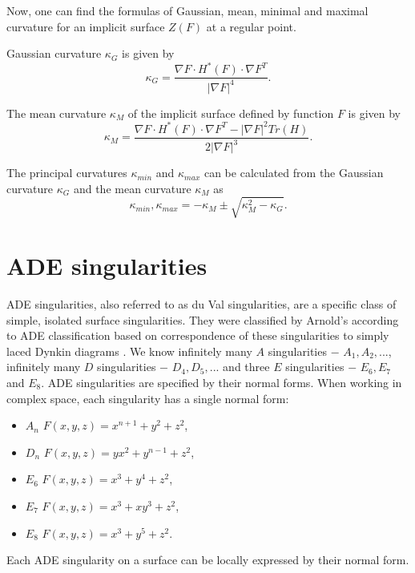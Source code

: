 Now, one can find the formulas of Gaussian, mean, minimal and maximal curvature
for an implicit surface $Z(F)$ at a regular point.

Gaussian curvature $\kappa_G$ is given by 
$$\kappa_G = \frac{\nabla F \cdot H^*(F) \cdot \nabla F^T}{|\nabla F|^4}.$$

The mean curvature $\kappa_M$ of the implicit surface defined by function $F$ is given by 
$$\kappa_M = \frac{\nabla F \cdot H^*(F) \cdot \nabla F^T - | \nabla F |^2 Tr(H)}{2|\nabla F|^3}.$$

The principal curvatures $\kappa_{min}$ and $\kappa_{max}$ can be calculated from the 
Gaussian curvature $\kappa_G$ and the mean curvature $\kappa_M$ as 
$$\kappa_{min}, \kappa_{max} = - \kappa_M \pm \sqrt{\kappa_M^2-\kappa_G}.$$

\section{ADE singularities}
\label{sub2.2}

ADE singularities, also referred to as du Val singularities, are a specific
class of simple, isolated surface singularities.
They were classified by Arnold's
\cite{arnol1972normal} according to ADE classification
\cite{hazewinkel1977ubiquity} based on
correspondence of these singularities to simply laced Dynkin diagrams
\cite{dynkin1947structure}.
We know infinitely many $A$ singularities $-$ $A_1, A_2, ...$,
infinitely many $D$ singularities $-$ $D_4, D_5, ...$ and three $E$
singularities $-$ $E_6, E_7$ and $E_8$.
ADE singularities are specified by their normal forms.
When working in complex space, each singularity has a single normal form:
\begin{itemize}
    \item $A_n$ \hspace{5mm} $F(x,y,z)=x^{n+1}+y^2+z^2$,
    \item $D_n$ \hspace{5mm} $F(x,y,z)=yx^2+y^{n-1}+z^2$,
    \item $E_6$ \hspace{5mm} $F(x,y,z)=x^3+y^4+z^2$,
    \item $E_7$ \hspace{5mm} $F(x,y,z)=x^3+xy^3+z^2$,
    \item $E_8$ \hspace{5mm} $F(x,y,z)=x^3+y^5+z^2$.
\end{itemize}

Each ADE singularity on a surface can be locally expressed by their
normal form.

